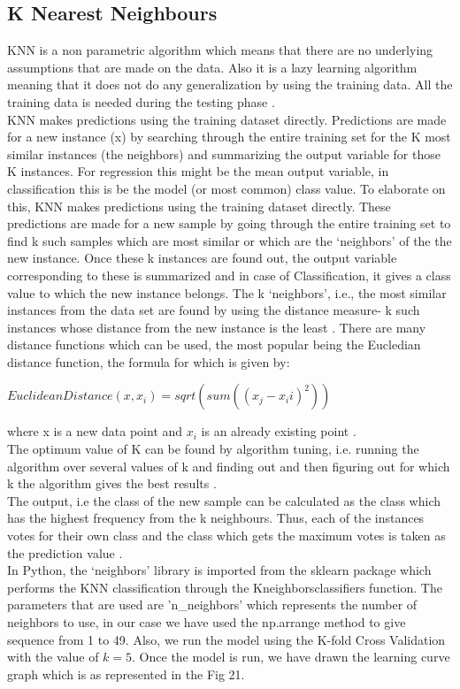 \subsection{K Nearest Neighbours}
KNN is a non parametric algorithm which means that there are no underlying assumptions that are made on the data. Also it is a lazy learning algorithm meaning that it does not do any generalization by using the training data. All the training data is needed during the testing phase \cite{link11}.\\
KNN makes predictions using the training dataset directly. Predictions are made for a new instance (x) by searching through the entire training set for the K most similar instances (the neighbors) and summarizing the output variable for those K instances. For regression this might be the mean output variable, in classification this is be the model (or most common) class value. To elaborate on this, KNN makes predictions using the training dataset directly. These predictions are made for a new sample by going through the entire training set to find k such samples which are most similar or which are the `neighbors' of the the new instance. Once these k instances are found out, the output variable corresponding to these is summarized and in case of Classification, it gives a class value to which the new instance belongs. The k `neighbors', i.e., the most similar instances from the data set are found by using the distance measure- k such instances whose distance from the new instance is the least \cite{link11}. There are many distance functions which can be used, the most popular being the Eucledian distance function, the formula for which is given by:

$EuclideanDistance(x, x_i) = sqrt( sum( (x_j-x_ii)^2 ) )$

where x is a new data point and $x_i$ is an already existing point \cite{link11}.\\
The optimum value of K can be found by algorithm tuning, i.e. running the algorithm over several values of k and finding out and then figuring out for which k the algorithm gives the best results \cite{link12}.\\
The output, i.e the class of the new sample can be calculated as the class which has the highest frequency from the k neighbours. Thus, each of the instances votes for their own class and the class which gets the maximum votes is taken as the prediction value \cite{link12}. \\
In Python, the `neighbors' library is imported from the sklearn package which performs the KNN classification through the Kneighborsclassifiers function. The parameters that are used are 'n\_neighbors' which represents the number of neighbors to use, in our case we have used the np.arrange method to give  sequence from 1 to 49. Also, we run the model using the K-fold Cross Validation with the value of $k=5$. Once the model is run, we have drawn the learning curve graph which is as represented in the Fig 21. 

